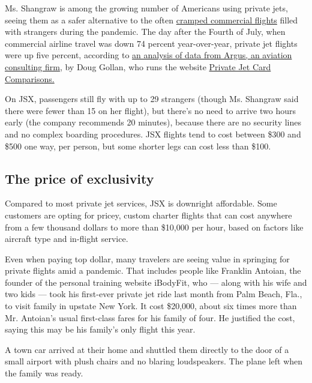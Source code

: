 Ms. Shangraw is among the growing number of Americans using private
jets, seeing them as a safer alternative to the often
\href{https://www.nytimes.com/2020/07/21/travel/crowded-flights-coronavirus.html}{cramped
commercial flights} filled with strangers during the pandemic. The day
after the Fourth of July, when commercial airline travel was down 74
percent year-over-year, private jet flights were up five percent,
according to
\href{https://privatejetcardcomparisons.com/2020/07/10/heres-where-the-private-jets-were-flying-for-the-july-4th-holiday/\#more-38454}{an
analysis of data from Argus, an aviation consulting firm}, by Doug
Gollan, who runs the website
\href{https://privatejetcardcomparisons.com/}{Private Jet Card
Comparisons.}

On JSX, passengers still fly with up to 29 strangers (though Ms.
Shangraw said there were fewer than 15 on her flight), but there's no
need to arrive two hours early (the company recommends 20 minutes),
because there are no security lines and no complex boarding procedures.
JSX flights tend to cost between \$300 and \$500 one way, per person,
but some shorter legs can cost less than \$100.

\hypertarget{the-price-of-exclusivity}{%
\subsection{The price of exclusivity}\label{the-price-of-exclusivity}}

Compared to most private jet services, JSX is downright affordable. Some
customers are opting for pricey, custom charter flights that can cost
anywhere from a few thousand dollars to more than \$10,000 per hour,
based on factors like aircraft type and in-flight service.

Even when paying top dollar, many travelers are seeing value in
springing for private flights amid a pandemic. That includes people like
Franklin Antoian, the founder of the personal training website iBodyFit,
who --- along with his wife and two kids --- took his first-ever private
jet ride last month from Palm Beach, Fla., to visit family in upstate
New York. It cost \$20,000, about six times more than Mr. Antoian's
usual first-class fares for his family of four. He justified the cost,
saying this may be his family's only flight this year.

A town car arrived at their home and shuttled them directly to the door
of a small airport with plush chairs and no blaring loudspeakers. The
plane left when the family was ready.

